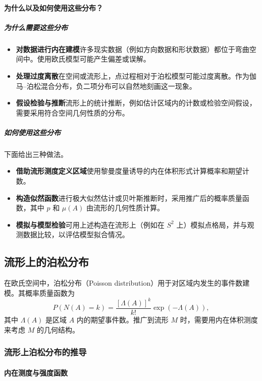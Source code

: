 \paragraph{为什么以及如何使用这些分布？}

\subparagraph{为什么需要这些分布}

\begin{itemize}
  \item \textbf{对数据进行内在建模}许多现实数据（例如方向数据和形状数据）都位于弯曲空间中。使用欧氏模型可能产生偏差或误解。
  \item \textbf{处理过度离散}在空间或流形上，点过程相对于泊松模型可能过度离散。作为伽马–泊松混合分布，负二项分布可以自然地刻画这一现象。
  \item \textbf{假设检验与推断}流形上的统计推断，例如估计区域内的计数或检验空间假设，需要采用符合空间几何性质的分布。
\end{itemize}

\subparagraph{如何使用这些分布}

下面给出三种做法。
\begin{itemize}
  \item \textbf{借助流形测度定义区域}使用黎曼度量诱导的内在体积形式计算概率和期望计数。
  \item \textbf{构造似然函数}进行极大似然估计或贝叶斯推断时，采用推广后的概率质量函数，其中 $p$ 和 $\mu(A)$ 由流形的几何性质计算。
  \item \textbf{模拟与模型检验}可用上述构造在流形上（例如在 $S^2$ 上）模拟点格局，并与观测数据比较，以评估模型拟合情况。
\end{itemize}

\subsection{流形上的泊松分布}

在欧氏空间中，泊松分布（Poisson distribution）用于对区域内发生的事件数建模。其概率质量函数为
\[
  P(N(A)=k)=\frac{[\Lambda(A)]^k}{k!}\exp(-\Lambda(A)),
\]
其中 $\Lambda(A)$ 是区域 $A$ 内的期望事件数。推广到流形 $M$ 时，需要用内在体积测度来考虑 $M$ 的几何结构。

\subsubsection{流形上泊松分布的推导}

\paragraph{内在测度与强度函数}

